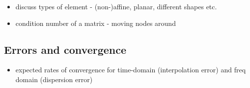\begin{itemize}
	\item discuss types of element - (non-)affine, planar, different shapes etc.
	\item condition number of a matrix - moving nodes around %
\end{itemize}

\subsection{Errors and convergence}
\begin{itemize}
  \item expected rates of convergence for time-domain (interpolation error) and freq domain (dispersion error)
\end{itemize}

